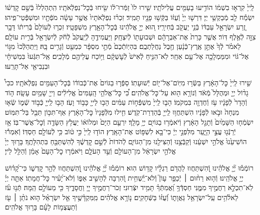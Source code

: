 \documentclass[twoside, openany, parskip=half, 11pt]{book}
\begin{document}
\begin{narrow}
לַֽייָ֙ קִרְא֣וּ בִשְׁמ֔וֹ
הוֹדִ֥יעוּ בָעַמִּ֖ים עֲלִילֹתָֽיו׃
שִׁ֤ירוּ לוֹ֙ זַמְּֿרוּ־ל֔וֹ שִׂ֖יחוּ בְּֿכׇל־נִפְלְֿאֹתָֽיו׃
הִֽתְהַלְלוּ֙ בְּֿשֵׁ֣ם קׇדְשׁ֔וֹ יִשְׂמַ֕ח לֵ֖ב מְֿבַקְשֵׁ֥י יְיָ׃
דִּרְשׁ֤וּ יְיָ֙ וְֿעֻזּ֔וֹ בַּקְּֿשׁ֥וּ פָנָ֖יו תָּמִֽיד׃
זִכְר֗וּ נִפְלְֿאֹתָיו֙ אֲשֶׁ֣ר עָשָׂ֔ה מֹפְֿתָ֖יו וּמִשְׁפְּֿֿטֵי־פִֽיהוּ׃
זֶ֚רַע יִשְׂרָאֵ֣ל עַבְדּ֔וֹ בְּֿנֵ֥י יַעֲקֹ֖ב בְּֿחִירָֽיו׃
ה֚וּא יְיָ֣ אֱלֹהֵ֔ינוּ בְּֿכׇל־הָאָ֖רֶץ מִשְׁפָּטָֽיו׃
זִכְר֤וּ לְֿעוֹלָם֙ בְּֿרִית֔וֹ דָּבָ֥ר צִוָּ֖ה לְֿאֶ֥לֶף דּֽוֹר׃
אֲשֶׁ֤ר כָּרַת֙ אֶת־אַבְרָהָ֔ם וּשְׁבוּעָת֖וֹ לְֿיִצְחָֽק׃
וַיַּעֲמִידֶ֤הָ לְֿיַֽעֲקֹב֙ לְֿחֹ֔ק לְֿיִשְׂרָאֵ֖ל בְּֿרִ֥ית עוֹלָֽם׃
לֵאמֹ֗ר לְֿךָ֙ אֶתֵּ֣ן אֶֽרֶץ־כְּֿנָ֔עַן חֶ֖בֶל נַחֲלַתְכֶֽם׃
בִּהְיֽוֹתְֿכֶם֙ מְֿתֵ֣י מִסְפָּ֔ר כִּמְעַ֖ט וְֿגָרִ֥ים בָּֽהּ׃
וַיִּֽתְהַלְּֿכוּ֙ מִגּ֣וֹי אֶל־גּ֔וֹי וּמִמַּמְלָכָ֖ה אֶל־עַ֥ם אַחֵֽר׃
לֹֽא־הִנִּ֤יחַ לְֿאִישׁ֙ לְֿעׇשְׁקָ֔ם וַיּ֥וֹכַח עֲלֵיהֶ֖ם מְֿלָכִֽים׃
אַֽל־תִּגְּֿעוּ֙ בִּמְשִׁיחָ֔י וּבִנְבִיאַ֖י אַל־תָּרֵֽעוּ׃

שִׁ֤ירוּ לַֽייָ֙ כׇּל־הָאָ֔רֶץ בַּשְּֿׂר֥וּ מִיּֽוֹם־אֶל־י֖וֹם יְֿשׁוּעָתֽוֹ׃
סַפְּֿר֤וּ בַגּוֹיִם֙ אֶת־כְּֿבוֹד֔וֹ בְּֿכׇל־הָעַמִּ֖ים נִפְלְֿאֹתָֽיו׃
ככִּי֩ גָד֨וֹל יְיָ֤ וּמְהֻלָּל֙ מְֿאֹ֔ד וְֿנוֹרָ֥א ה֖וּא עַל־כׇּל־אֱלֹהִֽים׃
כִּ֠י כׇּל־אֱלֹהֵ֤י הָֽעַמִּים֙ אֱלִילִ֔ים וַייָ֖ שָׁמַ֥יִם עָשָֽׂה׃
ה֤וֹד וְֿהָדָר֙ לְֿפָנָ֔יו עֹ֥ז וְֿחֶדְוָ֖ה בִּמְקֹמֽוֹ׃
הָב֤וּ לַֽייָ֙ מִשְׁפְּֿֿח֣וֹת עַמִּ֔ים הָב֥וּ לַייָ֖ כָּב֥וֹד וָעֹֽז׃
הָב֥וּ לַֽייָ֖ כְּֿב֣וֹד שְֿׁמ֑וֹ שְֿׂא֤וּ מִנְחָה֙ וּבֹ֣אוּ לְֿפָנָ֔יו
הִשְׁתַּחֲו֥וּ לַֽייָ֖ בְּֿהַדְרַת־קֹֽדֶשׁ׃ חִ֤ילוּ מִלְּֿפָנָיו֙ כׇּל־הָאָ֔רֶץ
אַף־תִּכּ֥וֹן תֵּבֵ֖ל בַּל־תִּמּֽוֹט׃ יִשְׂמְֿח֤וּ הַשָּׁמַ֙יִם֙ וְֿתָגֵ֣ל הָאָ֔רֶץ
וְֿיֹאמְֿר֥וּ בַגּוֹיִ֖ם יְיָ֥ מָלָֽךְ׃ יִרְעַ֤ם הַיָּם֙ וּמְלוֹא֔וֹ
יַעֲלֹ֥ץ הַשָּׂדֶ֖ה וְֿכׇל־אֲשֶׁר־בּֽוֹ׃ אָ֥ז יְֿרַנְּֿנ֖וּ עֲצֵ֣י הַיָּ֑עַר
מִלִּפְנֵ֣י יְיָ֔ כִּי־בָ֖א לִשְׁפּ֥וֹט אֶת־הָאָֽרֶץ׃ הוֹד֤וּ לַֽייָ֙ כִּ֣י ט֔וֹב
כִּ֥י לְֿעוֹלָ֖ם חַסְדּֽוֹ׃ וְֿאִמְר֕וּ הוֹשִׁיעֵ֙נוּ֙ אֱלֹהֵ֣י יִשְׁעֵ֔נוּ
וְֿקַבְּֿצֵ֥נוּ וְֿהַצִּילֵ֖נוּ מִן־הַגּוֹיִ֑ם לְֿהֹדוֹת֙ לְֿשֵׁ֣ם קׇדְשֶׁ֔ךָ
לְֿהִשְׁתַּבֵּ֖חַ בִּתְהִלָּתֶֽךָ׃ בָּר֤וּךְ יְיָ֙ אֱלֹהֵ֣י יִשְׂרָאֵ֔ל
מִן־הָעוֹלָ֖ם וְֿעַ֣ד הָעֹלָ֑ם וַיֹּאמְֿר֤וּ כׇל־הָעָם֙ אָמֵ֔ן וְֿהַלֵּ֖ל לַייָ׃
\end{narrow}

\newcommand{\negline}{\vspace{-\baselineskip}}

\negline

%
רוֹמְֿמ֡וּ יְ֘יָ֤ אֱלֹהֵ֗ינוּ וְֽֿ֭הִשְׁתַּחֲווּ לַהֲדֹ֥ם רַגְלָ֗יו קָד֥וֹשׁ הֽוּא׃ 
רוֹמְֿמ֡וּ יְ֘יָ֤ אֱלֹהֵ֗ינוּ וְֽֿ֭הִשְׁתַּחֲווּ לְֿהַ֣ר קׇדְשׁ֑וֹ כִּי־קָ֝ד֗וֹשׁ יְיָ֥ אֱלֹהֵֽינוּ׃ 
%
וְֿה֤וּא רַח֨וּם ׀ יְֿכַפֵּ֥ר עָוֺן֮ וְֽֿלֹא־יַֽ֫שְׁחִ֥ית וְֿ֭הִרְבָּה לְֿהָשִׁ֣יב אַפּ֑וֹ 
וְֿלֹא־יָ֝עִ֗יר כׇּל־חֲמָתֽוֹ׃ 
%
אַתָּ֤ה יְיָ֗ לֹֽא־תִכְלָ֣א רַחֲמֶ֣יךָ מִמֶּ֑נִּי חַסְדְּֿֿךָ֥ וַ֝אֲמִתְּֿךָ֗ תָּמִ֥יד יִצְּֿרֽוּנִי׃ 
זְכֹר־רַחֲמֶ֣יךָ יְיָ֭ וַחֲסָדֶ֑יךָ כִּ֖י מֵעוֹלָ֣ם הֵֽמָּה׃ 
תְּֿנ֥וּ עֹ֗ז לֵאלֹ֫הִ֥ים עַֽל־יִשְׂרָאֵ֥ל גַּאֲוָת֑וֹ וְֿ֝עֻזּ֗וֹ בַּשְּֿׁחָקִֽים׃ 
נ֤וֹרָ֥א אֱלֹהִ֗ים מִֽמִּקְדָּ֫שֶׁ֥יךָ אֵ֤ל יִשְׂרָאֵ֗ל 
ה֤וּא נֹתֵ֨ן ׀ עֹ֖ז וְֿתַעֲצֻמ֥וֹת לָעָ֗ם בָּר֥וּךְ אֱלֹהִֽים׃ 
\end{document}
